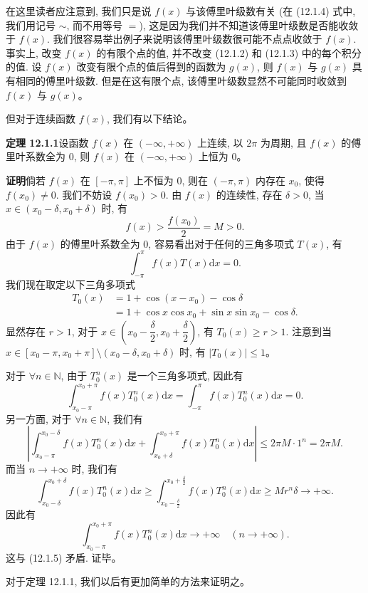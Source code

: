 \documentclass[UTF8, 12pt, fontset=fandol, oneside]{ctexart}
\begin{document}
在这里读者应注意到, 我们只是说 $f(x)$ 与该傅里叶级数有关 (在 (12.1.4) 式中, 我们用记号 $\sim$, 而不用等号 $=$), 这是因为我们并不知道该傅里叶级数是否能收敛于 $f(x)$. 我们很容易举出例子来说明该傅里叶级数很可能不点点收敛于 $f(x)$. 事实上, 改变 $f(x)$ 的有限个点的值, 并不改变 (12.1.2) 和 (12.1.3) 中的每个积分的值. 设 $f(x)$ 改变有限个点的值后得到的函数为 $g(x)$, 则 $f(x)$ 与 $g(x)$ 具有相同的傅里叶级数. 但是在这有限个点, 该傅里叶级数显然不可能同时收敛到 $f(x)$ 与 $g(x)$。

但对于连续函数 $f(x)$, 我们有以下结论。

\noindent\textbf{定理 12.1.1}\quad 设函数 $f(x)$ 在 $(-\infty,+\infty)$ 上连续, 以 $2\pi$ 为周期, 且 $f(x)$ 的傅里叶系数全为 $0$, 则 $f(x)$ 在 $(-\infty,+\infty)$ 上恒为 $0$。

\noindent\textbf{证明}\quad 倘若 $f(x)$ 在 $[-\pi,\pi]$ 上不恒为 $0$, 则在 $(-\pi,\pi)$ 内存在 $x_0$, 使得 $f(x_0)\ne0$. 我们不妨设 $f(x_0)>0$. 由 $f(x)$ 的连续性, 存在 $\delta>0$, 当 $x\in(x_0-\delta,x_0+\delta)$ 时, 有
\[
  f(x)>\frac{f(x_0)}{2}=M>0.
\]
由于 $f(x)$ 的傅里叶系数全为 $0$, 容易看出对于任何的三角多项式 $T(x)$, 有
\[
  \int_{-\pi}^{\pi}f(x)T(x)\mathrm dx=0.
\]
我们现在取定以下三角多项式
\[
\begin{aligned}
  T_0(x)&=1+\cos(x-x_0)-\cos\delta\\
  &=1+\cos x\cos x_0+\sin x\sin x_0-\cos\delta.
\end{aligned}
\]
显然存在 $r>1$, 对于 $x\in\left(x_0-\dfrac{\delta}{2},x_0+\dfrac{\delta}{2}\right)$, 有 $T_0(x)\geqslant r>1$. 注意到当 $x\in[x_0-\pi,x_0+\pi]\setminus(x_0-\delta,x_0+\delta)$ 时, 有 $|T_0(x)|\leqslant1$。

对于 $\forall n\in\mathbb N$, 由于 $T_0^n(x)$ 是一个三角多项式, 因此有
\begin{equation}
  \int_{x_0-\pi}^{x_0+\pi}f(x)T_0^n(x)\mathrm dx
  =\int_{-\pi}^{\pi}f(x)T_0^n(x)\mathrm dx=0.
  \tag{12.1.5}
\end{equation}
另一方面, 对于 $\forall n\in\mathbb N$, 我们有
\[
  \left|
    \int_{x_0-\pi}^{x_0-\delta}f(x)T_0^n(x)\mathrm dx
    +\int_{x_0+\delta}^{x_0+\pi}f(x)T_0^n(x)\mathrm dx
  \right|\leqslant 2\pi M\cdot1^n=2\pi M.
\]
而当 $n\to+\infty$ 时, 我们有
\[
  \int_{x_0-\delta}^{x_0+\delta}f(x)T_0^n(x)\mathrm dx
  \geqslant \int_{x_0-\frac{\delta}{2}}^{x_0+\frac{\delta}{2}}f(x)T_0^n(x)\mathrm dx
  \geqslant Mr^n\delta\to+\infty.
\]
因此有
\[
  \int_{x_0-\pi}^{x_0+\pi}f(x)T_0^n(x)\mathrm dx\to+\infty
  \quad (n\to+\infty).
\]
这与 (12.1.5) 矛盾. 证毕。

对于定理 12.1.1, 我们以后有更加简单的方法来证明之。
\end{document}
